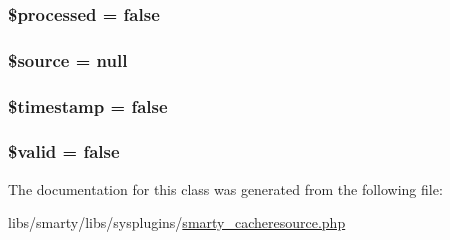\subsubsection[{\$processed}]{\setlength{\rightskip}{0pt plus 5cm}\$processed = false}\label{class_smarty___template___cached_aac44a4d5065e07e9a7a51ce8ef4a5c71}
\hypertarget{class_smarty___template___cached_a99a2b085f0a29bd5d799fdcbb63d261b}{}
\subsubsection[{\$source}]{\setlength{\rightskip}{0pt plus 5cm}\$source = null}\label{class_smarty___template___cached_a99a2b085f0a29bd5d799fdcbb63d261b}
\hypertarget{class_smarty___template___cached_a2b69de9676dd97c675cd4d9bcceb684c}{}
\subsubsection[{\$timestamp}]{\setlength{\rightskip}{0pt plus 5cm}\$timestamp = false}\label{class_smarty___template___cached_a2b69de9676dd97c675cd4d9bcceb684c}
\hypertarget{class_smarty___template___cached_a0587674d27d00ef497e08e53ccf45bbb}{}
\subsubsection[{\$valid}]{\setlength{\rightskip}{0pt plus 5cm}\$valid = false}\label{class_smarty___template___cached_a0587674d27d00ef497e08e53ccf45bbb}


The documentation for this class was generated from the following file\+:\begin{DoxyCompactItemize}
\item 
libs/smarty/libs/sysplugins/\hyperlink{smarty__cacheresource_8php}{smarty\+\_\+cacheresource.\+php}\end{DoxyCompactItemize}
